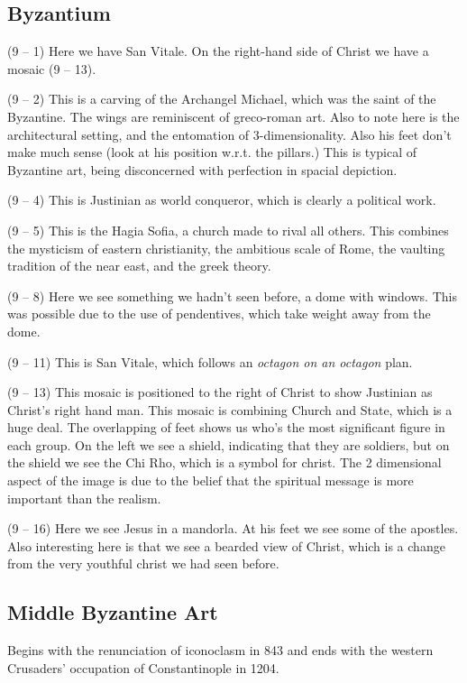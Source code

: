 \documentclass{article}
\begin{document}
    \begin{spacing}{1.2}
    \newpage
        \section{Byzantium}
        (9 -- 1) Here we have San Vitale. On the right-hand side of Christ we have a mosaic (9 -- 13).

        (9 -- 2) This is a carving of the Archangel Michael, which was the saint of the Byzantine. The wings are reminiscent of greco-roman art. Also to note here is the architectural setting, and the entomation of 3-dimensionality. Also his feet don't make much sense (look at his position w.r.t. the pillars.) This is typical of Byzantine art, being disconcerned with perfection in spacial depiction. 

        (9 -- 4) This is Justinian as world conqueror, which is clearly a political work.

        (9 -- 5) This is the Hagia Sofia, a church made to rival all others. This combines the mysticism of eastern christianity, the ambitious scale of Rome, the vaulting tradition of the near east, and the greek theory.

        (9 -- 8) Here we see something we hadn't seen before, a dome with windows. This was possible due to the use of pendentives, which take weight away from the dome.

        (9 -- 11) This is San Vitale, which follows an \emph{octagon on an octagon} plan.

        (9 -- 13) This mosaic is positioned to the right of Christ to show Justinian as Christ's right hand man. This mosaic is combining Church and State, which is a huge deal. The overlapping of feet shows us who's the most significant figure in each group. On the left we see a shield, indicating that they are soldiers, but on the shield we see the Chi Rho, which is a symbol for christ. The 2 dimensional aspect of the image is due to the belief that the spiritual message is more important than the realism.

        (9 -- 16) Here we see Jesus in a mandorla. At his feet we see some of the apostles. Also interesting here is that we see a bearded view of Christ, which is a change from the very youthful christ we had seen before.

        \subsection{Middle Byzantine Art}
        \begin{flushright}
            Begins with the renunciation of iconoclasm in 843 and ends with the western Crusaders' occupation of Constantinople in 1204.
        \end{flushright}


\end{spacing}
\end{document}
